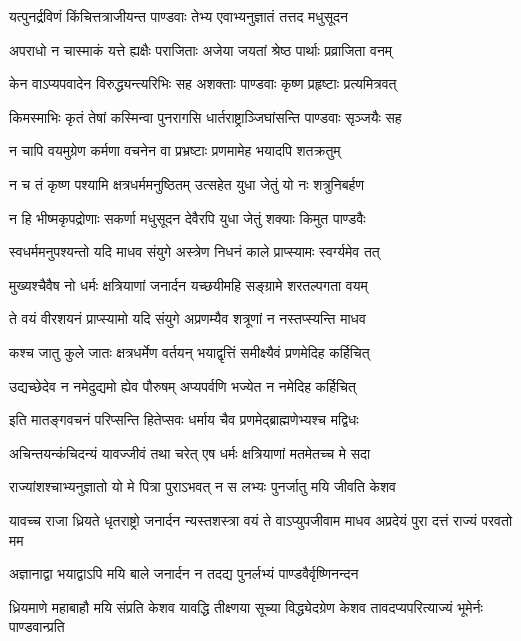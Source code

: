 \twolineshloka
{यत्पुनर्द्रविणं किंचित्तत्राजीयन्त पाण्डवाः}
{तेभ्य एवाभ्यनुज्ञातं तत्तद मधुसूदन}


\twolineshloka
{अपराधो न चास्माकं यत्ते ह्यक्षैः पराजिताः}
{अजेया जयतां श्रेष्ठ पार्थाः प्रव्राजिता वनम्}


\twolineshloka
{केन वाऽप्यपवादेन विरुद्ध्यन्त्यरिभिः सह}
{अशक्ताः पाण्डवाः कृष्ण प्रहृष्टाः प्रत्यमित्रवत्}


\twolineshloka
{किमस्माभिः कृतं तेषां कस्मिन्वा पुनरागसि}
{धार्तराष्ट्राञ्जिघांसन्ति पाण्डवाः सृञ्जयैः सह}


\twolineshloka
{न चापि वयमुग्रेण कर्मणा वचनेन वा}
{प्रभ्रष्टाः प्रणमामेह भयादपि शतक्रतुम्}


\twolineshloka
{न च तं कृष्ण पश्यामि क्षत्रधर्ममनुष्ठितम्}
{उत्सहेत युधा जेतुं यो नः शत्रुनिबर्हण}


\twolineshloka
{न हि भीष्मकृपद्रोणाः सकर्णा मधुसूदन}
{देवैरपि युधा जेतुं शक्याः किमुत पाण्डवैः}


\twolineshloka
{स्वधर्ममनुपश्यन्तो यदि माधव संयुगे}
{अस्त्रेण निधनं काले प्राप्स्यामः स्वर्ग्यमेव तत्}


\twolineshloka
{मुख्यश्चैवैष नो धर्मः क्षत्रियाणां जनार्दन}
{यच्छयीमहि सङ्ग्रामे शरतल्पगता वयम्}


\twolineshloka
{ते वयं वीरशयनं प्राप्स्यामो यदि संयुगे}
{अप्रणम्यैव शत्रूणां न नस्तप्स्यन्ति माधव}


\twolineshloka
{कश्च जातु कुले जातः क्षत्रधर्मेण वर्तयन्}
{भयाद्वृत्तिं समीक्ष्यैवं प्रणमेदिह कर्हिचित्}


\twolineshloka
{उद्यच्छेदेव न नमेदुद्यमो ह्येव पौरुषम्}
{अप्यपर्वणि भज्येत न नमेदिह कर्हिचित्}


\twolineshloka
{इति मातङ्गवचनं परिप्सन्ति हितेप्सवः}
{धर्माय चैव प्रणमेद्ब्राह्मणेभ्यश्च मद्विधः}


\twolineshloka
{अचिन्तयन्कंचिदन्यं यावज्जीवं तथा चरेत्}
{एष धर्मः क्षत्रियाणां मतमेतच्च मे सदा}


\twolineshloka
{राज्यांशश्चाभ्यनुज्ञातो यो मे पित्रा पुराऽभवत्}
{न स लभ्यः पुनर्जातु मयि जीवति केशव}


\threelineshloka
{यावच्च राजा ध्रियते धृतराष्ट्रो जनार्दन}
{न्यस्तशस्त्रा वयं ते वाऽप्युपजीवाम माधव}
{अप्रदेयं पुरा दत्तं राज्यं परवतो मम}


\twolineshloka
{अज्ञानाद्वा भयाद्वाऽपि मयि बाले जनार्दन}
{न तदद्य पुनर्लभ्यं पाण्डवैर्वृष्णिनन्दन}


\threelineshloka
{ध्रियमाणे महाबाहौ मयि संप्रति केशव}
{यावद्धि तीक्ष्णया सूच्या विद्ध्येदग्रेण केशव}
{तावदप्यपरित्याज्यं भूमेर्नः पाण्डवान्प्रति}


